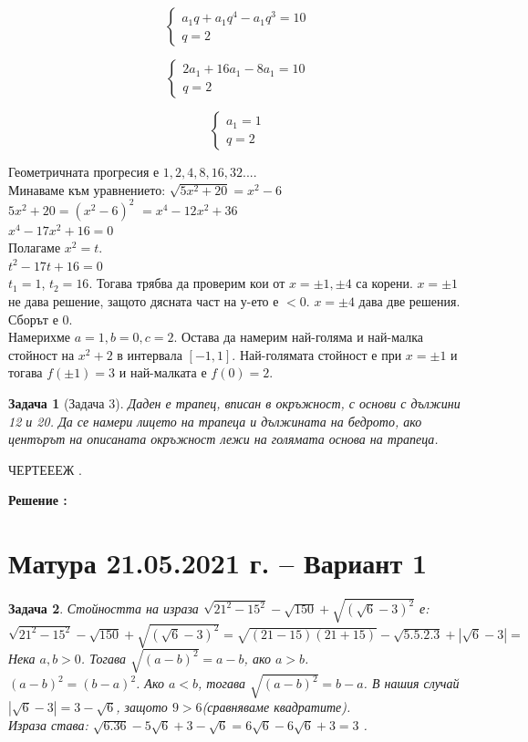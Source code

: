 \documentclass{article}
\newtheorem{problem}{Задача}
\newcounter{solution}
\newcommand\solution{%
	\stepcounter{solution}%
	\textbf{Решение :}\\%
}
\begin{document}
		\[
\begin{cases}
a_1 q + a_1 q^4- a_1q^3 = 10 \\
q = 2 
\end{cases}
\]

		\[
\begin{cases}
2a_1  + 16a_1 - 8a_1 = 10 \\
q = 2 
\end{cases}
\]

		\[
\begin{cases}
a_1 = 1 \\
q = 2 
\end{cases}
\]

Геометричната прогресия е $1,2,4,8,16,32...$. \\



Минаваме към уравнението: $\sqrt{5x^2 +20} = x^2-6$ \\
$5x^2 +20 = (x^2-6)^2$ $= x^4 - 12x^2 + 36$ \\
$x^4 - 17x^2 + 16 = 0 $ \\
Полагаме $x^2 = t$. \\
$t^2 - 17t + 16 = 0 $ \\
$t_1 = 1 $, $t_2 = 16. $
Тогава трябва да проверим кои от $x = \pm 1, \pm 4  $ са корени. $x = \pm 1$ не дава решение, защото дясната част на у-ето е $<0 $. $x = \pm 4$ дава две решения. Сборът е $0$. \\

Намерихме $ a = 1, b = 0, c = 2 $. Остава да намерим най-голяма и най-малка стойност на $x^2 + 2 $ в интервала $[-1,1]$. Най-голямата стойност е при $ x= \pm 1 $ и тогава $f(\pm 1 ) = 3 $ и най-малката е $f(0) = 2 $.

\begin{problem}[Задача 3]
	Даден е трапец, вписан в окръжност, с основи с дължини 12 и 20. Да се намери лицето на трапеца и дължината на бедрото, ако центърът на описаната окръжност лежи на голямата основа на трапеца.
\end{problem}
ЧЕРТЕЕЕЖ .


\solution 



\section{Матура 21.05.2021 г. – Вариант 1}

\begin{problem}
Стойността на израза $\sqrt{21^2 - 15^2} - \sqrt{150} + \sqrt{(\sqrt{6}-3)^2} $ е: \\
$\sqrt{21^2 - 15^2} - \sqrt{150} + \sqrt{(\sqrt{6}-3)^2} = \sqrt{(21-15)(21+15)} - \sqrt{5.5.2.3} + \left| \sqrt{6} - 3 \right| = $ \\
Нека $a,b>0 $. Тогава
$\sqrt{(a-b)^2} = a-b $, ако $a>b$. \\
$(a-b)^2 = (b-a)^2$. Ако $a<b $, тогава $\sqrt{(a-b)^2} = b-a $. В нашия случай $\left| \sqrt{6} - 3 \right| = 3 - \sqrt6$, защото $9 > 6 $(сравняваме квадратите). \\
Израза става: $\sqrt{6.36} - 5\sqrt{6} + 3 - \sqrt{6} = 6\sqrt{6} - 6\sqrt{6} + 3  = 3$ .
\end{problem}
\end{document}
